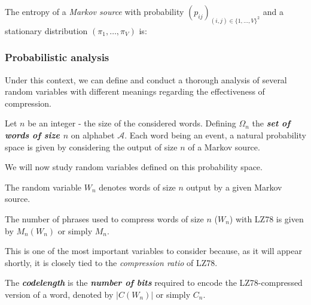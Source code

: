     \begin{prop}
        \label{prop:markoventropy}
        The entropy of a \emph{Markov source} with probability
        $(p_{i j})_{(i, j) \in { \{1,\dots,V\} }^2} $ and a 
        stationary distribution $(\pi_1, \dots, \pi_V)$ is:
    \end{prop}

    
\subsubsection{ Probabilistic analysis }

Under this context, we can define and conduct a thorough
analysis of several random variables with different meanings
regarding the effectiveness of compression.

\begin{nota}
    \label{nota:universe}
    Let $n$ be an integer - the size of the considered words.
    Defining $\Omega_n$ the \emph{\bfseries set of words of size $n$} on alphabet
    $\mathcal{A}$. Each word being an event, a natural probability
    space is given by considering the output of size $n$ of a Markov
    source.
\end{nota}

\begin{rmk}
    \label{rmk:probaspace}
    We will now study random variables defined 
    on this probability space. 
\end{rmk}

\begin{nota}
    \label{nota:output}
    The random variable $W_n$ denotes words of size $n$ output by a given Markov source.
\end{nota}

\begin{nota}
    \label{nota:numberphrases}
    The number of phrases used to compress words of size $n$ ($W_n$) with
    LZ78 is given by $M_n(W_n)$ or simply $M_n$.
\end{nota}

\begin{rmk}
    \label{rmk:numberphrases}
    This is one of the most important variables to consider because,
    as it will appear shortly, it is closely tied to the \emph{compression 
    ratio} of LZ78.
\end{rmk}

\begin{df}
    \label{df:codelength}
    The \emph{\bfseries codelength} is the \emph{\bfseries number of bits} required 
    to encode the LZ78-compressed version of a word, denoted by $|C(W_n)|$ or 
    simply $C_n$.
\end{df}

